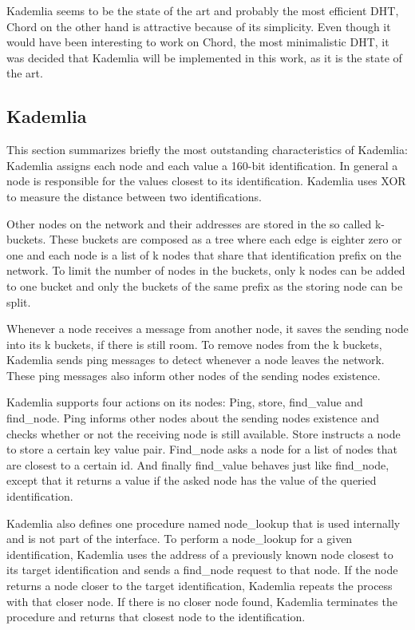 \documentclass[a4paper, 12pt]{article} %
\begin{document}
Kademlia seems to be the state of the art and probably the most efficient DHT, Chord on the other hand is attractive because of its simplicity. Even though it would have been interesting to work on Chord, the most minimalistic DHT, it was decided that Kademlia will be implemented in this work, as it is the state of the art. 

\subsection{Kademlia}

This section summarizes briefly the most outstanding characteristics of Kademlia: Kademlia assigns each node and each value a 160-bit identification. In general a node is responsible for the values closest to its identification. Kademlia uses XOR to measure the distance between two identifications. 

Other nodes on the network and their addresses are stored in the so called k-buckets. These buckets are composed as a tree where each edge is eighter zero or one and each node is a list of k nodes that share that identification prefix on the network. To limit the number of nodes in the buckets, only k nodes can be added to one bucket and only the buckets of the same prefix as the storing node can be split. 

Whenever a node receives a message from another node, it saves the sending node into its k buckets, if there is still room. To remove nodes from the k buckets, Kademlia sends ping messages to detect whenever a node leaves the network. These ping messages also inform other nodes of the sending nodes existence.

Kademlia supports four actions on its nodes: Ping, store, find\_value and find\_node. Ping informs other nodes about the sending nodes existence and checks whether or not the receiving node is still available. Store instructs a node to store a certain key value pair. Find\_node asks a node for a list of nodes that are closest to a certain id. And finally find\_value behaves just like find\_node, except that it returns a value if the asked node has the value of the queried identification.

Kademlia also defines one procedure named node\_lookup that is used internally and is not part of the interface. To perform a node\_lookup for a given identification, Kademlia uses the address of a previously known node closest to its target identification and sends a find\_node request to that node. If the node returns a node closer to the target identification, Kademlia repeats the process with that closer node. If there is no closer node found, Kademlia terminates the procedure and returns that closest node to the identification.
\end{document}
